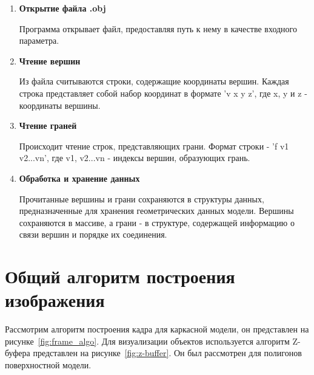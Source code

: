\begin{enumerate}
	\item \textbf{Открытие файла .obj}
	
	Программа открывает файл, предоставляя путь к нему в качестве входного параметра.
	
	\item \textbf{Чтение вершин}
	
	Из файла считываются строки, содержащие координаты вершин. 
	Каждая строка представляет собой набор координат в формате 'v x y z', где x, y и z - координаты вершины.
	
	\item \textbf{Чтение граней}
	
	Происходит чтение строк, представляющих грани. 
	Формат строки - 'f v1 v2...vn', где v1, v2...vn - индексы вершин, образующих грань.
	
	\item \textbf{Обработка и хранение данных}
	
	Прочитанные вершины и грани сохраняются в структуры данных, предназначенные для хранения геометрических данных 
	модели. 
	Вершины сохраняются в массиве, а грани - в структуре, содержащей информацию о связи вершин и порядке их соединения.
	
\end{enumerate}


\section{Общий алгоритм построения изображения}
Рассмотрим алгоритм построения кадра для каркасной модели, он представлен на рисунке~\ref{fig:frame_algo}. 
Для визуализации объектов используется алгоритм Z-буфера представлен на рисунке~\ref{fig:z-buffer}.
Он был рассмотрен для полигонов поверхностной модели.


